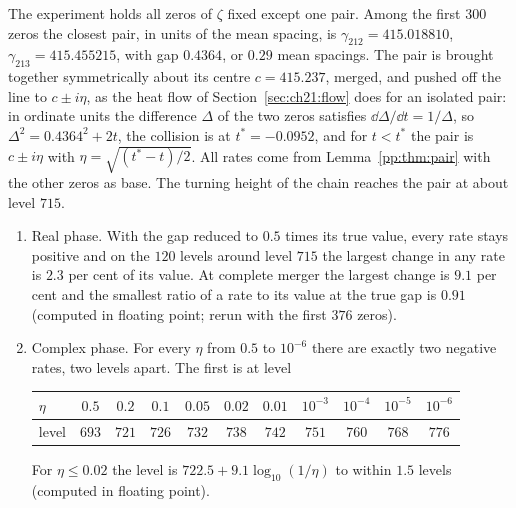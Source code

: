 The experiment holds all zeros of $\zeta$ fixed except one pair. Among the first $300$ zeros the closest pair, in units of the mean spacing, is $\gamma_{212}=415.018810$, $\gamma_{213}=415.455215$, with gap $0.4364$, or $0.29$ mean spacings. The pair is brought together symmetrically about its centre $c=415.237$, merged, and pushed off the line to $c\pm i\eta$, as the heat flow of Section~\ref{sec:ch21:flow} does for an isolated pair: in ordinate units the difference $\Delta$ of the two zeros satisfies $\dd\Delta/\dd t=1/\Delta$, so $\Delta^2=0.4364^2+2t$, the collision is at $t^*=-0.0952$, and for $t<t^*$ the pair is $c\pm i\eta$ with $\eta=\sqrt{(t^*-t)/2}$. All rates come from Lemma~\ref{pp:thm:pair} with the other zeros as base. The turning height of the chain reaches the pair at about level $715$.

\begin{computation}\label{pp:comp:coll}
\begin{enumerate}
\item Real phase. With the gap reduced to $0.5$ times its true value, every rate stays positive and on the $120$ levels around level $715$ the largest change in any rate is $2.3$ per cent of its value. At complete merger the largest change is $9.1$ per cent and the smallest ratio of a rate to its value at the true gap is $0.91$ (computed in floating point; rerun with the first $376$ zeros).
\item Complex phase. For every $\eta$ from $0.5$ to $10^{-6}$ there are exactly two negative rates, two levels apart. The first is at level
\begin{center}\small
\setlength{\tabcolsep}{3pt}\begin{tabular}{@{}lcccccccccc@{}}
\toprule
$\eta$ & $0.5$ & $0.2$ & $0.1$ & $0.05$ & $0.02$ & $0.01$ & $10^{-3}$ & $10^{-4}$ & $10^{-5}$ & $10^{-6}$\\
\midrule
level & $693$ & $721$ & $726$ & $732$ & $738$ & $742$ & $751$ & $760$ & $768$ & $776$\\
\bottomrule
\end{tabular}
\end{center}
For $\eta\le0.02$ the level is $722.5+9.1\log_{10}(1/\eta)$ to within $1.5$ levels (computed in floating point).
\end{enumerate}
\end{computation}

